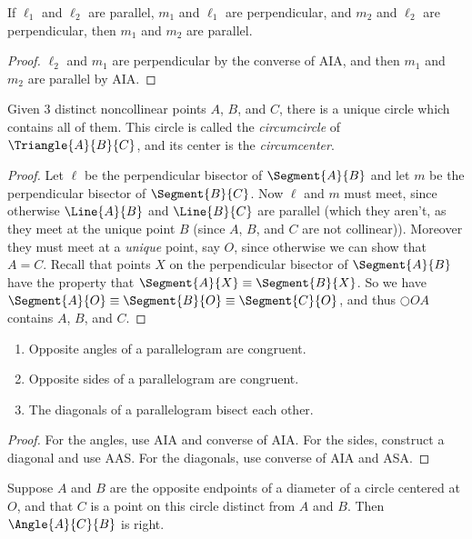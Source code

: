 \documentclass{article}
\begin{document}
\begin{prop}
If $\ell_1$ and $\ell_2$ are parallel, $m_1$ and $\ell_1$ are perpendicular, and $m_2$ and $\ell_2$ are perpendicular, then $m_1$ and $m_2$ are parallel.
\end{prop}

\begin{proof}
$\ell_2$ and $m_1$ are perpendicular by the converse of AIA, and then $m_1$ and $m_2$ are parallel by AIA.
\end{proof}

\begin{construct}
Given 3 distinct noncollinear points $A$, $B$, and $C$, there is a unique circle which contains all of them. This circle is called the \emph{circumcircle} of $\Triangle{A}{B}{C}$, and its center is the \emph{circumcenter}.
\end{construct}

\begin{proof}
Let $\ell$ be the perpendicular bisector of $\Segment{A}{B}$ and let $m$ be the perpendicular bisector of $\Segment{B}{C}$. Now $\ell$ and $m$ must meet, since otherwise $\Line{A}{B}$ and $\Line{B}{C}$ are parallel (which they aren't, as they meet at the unique point $B$ (since $A$, $B$, and $C$ are not collinear)). Moreover they must meet at a \emph{unique} point, say $O$, since otherwise we can show that $A = C$. Recall that points $X$ on the perpendicular bisector of $\Segment{A}{B}$ have the property that $\Segment{A}{X} \equiv \Segment{B}{X}$. So we have $\Segment{A}{O} \equiv \Segment{B}{O} \equiv \Segment{C}{O}$, and thus $\Circle{O}{A}$ contains $A$, $B$, and $C$.
\end{proof}

\begin{prop} \mbox{}
\begin{enumerate}
\item Opposite angles of a parallelogram are congruent.
\item Opposite sides of a parallelogram are congruent.
\item The diagonals of a parallelogram bisect each other.
\end{enumerate}
\end{prop}

\begin{proof}
For the angles, use AIA and converse of AIA. For the sides, construct a diagonal and use AAS. For the diagonals, use converse of AIA and ASA.
\end{proof}

\begin{prop}
Suppose $A$ and $B$ are the opposite endpoints of a diameter of a circle centered at $O$, and that $C$ is a point on this circle distinct from $A$ and $B$. Then $\Angle{A}{C}{B}$ is right.
\end{prop}
\end{document}
